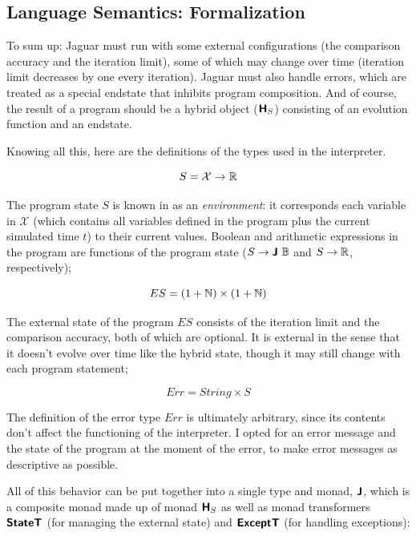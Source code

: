 \subsection{Language Semantics: Formalization}
\label{sec:semantics}

To sum up: Jaguar must run with some external configurations (the comparison accuracy and the iteration limit), some of which may change over time (iteration limit decreases by one every iteration). Jaguar must also handle errors, which are treated as a special endstate that inhibits program composition. And of course, the result of a program should be a hybrid object ($\textbf{\textsf{H}}_S$) consisting of an evolution function and an endstate.

Knowing all this, here are the definitions of the types used in the interpreter.


\begin{equation*}
  S = \mathcal{X} \rightarrow \R %
\end{equation*}

The program state $S$ is known in  as an \textit{environment}: it corresponds each variable in $\mathcal{X}$ (which contains all variables defined in the program plus the current simulated time $t$) to their current values. Boolean and arithmetic expressions in the program are functions of the program state ($S \rightarrow \textbf{\textsf{J}} \ \mathbb{B}$ and $S \rightarrow \mathbb{R}$, respectively);


\begin{equation*}
  ES = (1 + \mathbb{N}) \times (1 + \mathbb{N})
\end{equation*}

The external state of the program $ES$ consists of the iteration limit and the comparison accuracy, both of which are optional. It is external in the sense that it doesn't evolve over time like the hybrid state, though it may still change with each program statement; 


\begin{equation*}
  Err = String \times S
\end{equation*}

The definition of the error type $Err$ is ultimately arbitrary, since its contents don't affect the functioning of the interpreter. I opted for an error message and the state of the program at the moment of the error, to make error messages as descriptive as possible.

All of this behavior can be put together into a single type and monad, $\textbf{\textsf{J}}$, which is a composite monad made up of monad $\textbf{\textsf{H}}_S$ as well as monad transformers $\textbf{\textsf{StateT}}$ (for managing the external state) and $\textbf{\textsf{ExceptT}}$ (for handling exceptions):

